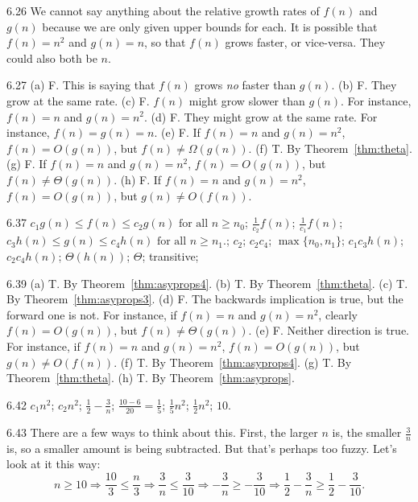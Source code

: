 \begin{Answer}{6.26}
We cannot say anything about the relative growth rates of $f(n)$ and $g(n)$
because we are only given upper bounds for each.
It is possible that $f(n)=n^2$ and $g(n)=n$, so that
$f(n)$ grows faster, or vice-versa.  They could also both be $n$.
\end{Answer}
\begin{Answer}{6.27}
(a) F. This is saying that $f(n)$ grows {\em no} faster than $g(n)$.
(b) F. They grow at the same rate.
(c) F. $f(n)$ might grow slower than $g(n)$.  For instance, $f(n)=n$ and $g(n)=n^2$.
(d) F. They might grow at the same rate.  For instance, $f(n)=g(n)=n$.
(e) F. If $f(n)=n$ and $g(n)=n^2$, $f(n)=O(g(n))$, but $f(n)\neq \Omega(g(n))$.
(f) T. By Theorem~\ref{thm:theta}.
(g) F. If $f(n)=n$ and $g(n)=n^2$, $f(n)=O(g(n))$, but $f(n)\neq \Theta(g(n))$.
(h) F. If $f(n)=n$ and $g(n)=n^2$, $f(n)=O(g(n))$, but $g(n)\neq O(f(n))$.
\end{Answer}
\begin{Answer}{6.37}
$c_1 g(n)\leq f(n) \leq c_2 g(n) \mbox{ for all } n\geq n_0$;
$\frac{1}{ c_2} f(n)$;
$\frac{1 }{ c_1} f(n)$;
$c_3 h(n)\leq g(n) \leq c_4 h(n) \mbox{ for all } n\geq n_1.$;
$c_2$; $c_2 c_4$;
$\max\{n_0,n_1\}$;
$c_1 c_3 h(n)$;
$c_2 c_4 h(n)$;
$\Theta(h(n))$;
$\Theta$;
transitive;
\end{Answer}
\begin{Answer}{6.39}
(a) T. By Theorem~\ref{thm:asyprops4}.
(b) T. By Theorem~\ref{thm:theta}.
(c) T. By Theorem~\ref{thm:asyprops3}.
(d) F. The backwards implication is true, but the forward one is not.  For instance,
if $f(n)=n$ and $g(n)=n^2$, clearly $f(n)=O(g(n))$, but $f(n)\neq \Theta(g(n))$.
(e) F. Neither direction is true.  For instance,
if $f(n)=n$ and $g(n)=n^2$, $f(n)=O(g(n))$, but $g(n)\neq O(f(n))$.
(f) T. By Theorem~\ref{thm:asyprops4}.
(g) T. By Theorem~\ref{thm:theta}.
(h) T. By Theorem~\ref{thm:asyprops}.
\end{Answer}
\begin{Answer}{6.42}
$c_{1}n^2$;
$c_{2}n^2$;
$\frac{1}{2} - \frac{3}{n}$;
$\frac{10-6}{20}=\frac{1}{5}$;
$\frac{1}{5}n^2$;
$\frac{1}{2}n^2$;
 $10$.
\end{Answer}
\begin{Answer}{6.43}
There are a few ways to think about this.  First, the larger $n$ is, the smaller $\frac{3}{n}$ is,
so a smaller amount is being subtracted.  But that's perhaps too fuzzy.  Let's look at it this way:
$$n\geq 10\Rightarrow
 \frac{10}{3} \leq \frac{n}{3}
\Rightarrow \frac{3}{n}\leq \frac{3}{10}
\Rightarrow -\frac{3}{n}\geq -\frac{3}{10}
\Rightarrow \frac{1}{2}-\frac{3}{n}\geq \frac{1}{2}-\frac{3}{10}.
$$
\end{Answer}
